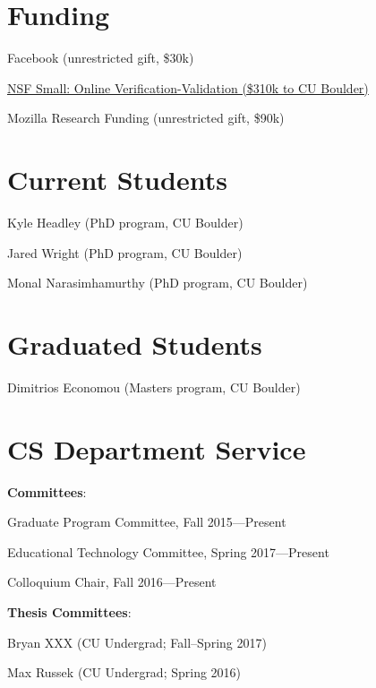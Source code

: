 \documentclass[10pt,letterpaper]{article}
\newcommand{\ReviewItem}[1]{\item #1}
\newcommand{\ReviewItemsBegin}{\begin{itemize}}
\newcommand{\ReviewItemsEnd}{\end{itemize}}
\renewenvironment{itemize}{
  \begin{list}{}{
    \setlength{\leftmargin}{1.5em}
    \setlength{\itemsep}{0.25em}
    \setlength{\parskip}{0pt}
    \setlength{\parsep}{0.25em}
  }
}{
  \end{list}
}
\begin{document}
\section*{Funding}
\begin{itemize}
\item Facebook (unrestricted gift, \$30k)

\item \href{https://www.nsf.gov/awardsearch/showAward?AWD_ID=1619282}
  {NSF Small: Online Verification-Validation (\$310k to CU Boulder)}

\item Mozilla Research Funding (unrestricted gift, \$90k)
\end{itemize}

\section*{Current Students}

\begin{itemize}
\item Kyle Headley (PhD program, CU Boulder)
\item Jared Wright (PhD program, CU Boulder)
\item Monal Narasimhamurthy (PhD program, CU Boulder)
\end{itemize}

\section*{Graduated Students}

\begin{itemize}
\item Dimitrios Economou (Masters program, CU Boulder)
\end{itemize}

\section*{CS Department Service}

\begin{itemize}

\item \textbf{Committees}:
\ReviewItemsBegin
\ReviewItem{ Graduate Program Committee, Fall 2015---Present}
\ReviewItem{ Educational Technology Committee, Spring 2017---Present}
\ReviewItemsEnd

\item Colloquium Chair, Fall 2016---Present

\item \textbf{Thesis Committees}:
\ReviewItemsBegin
\ReviewItem{ Bryan XXX (CU Undergrad; Fall--Spring 2017) }
\ReviewItem{ Max Russek (CU Undergrad; Spring 2016) }
\ReviewItemsEnd

\end{itemize}
\end{document}
